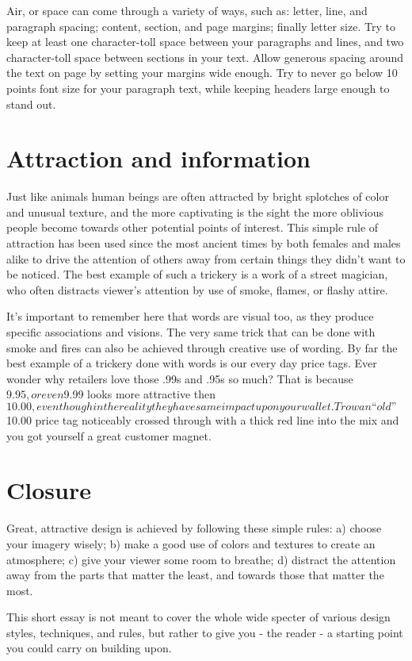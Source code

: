 Air, or space can come through a variety of ways, such as: letter, line, and
paragraph spacing; content, section, and page margins; finally letter size. Try
to keep at least one character-toll space between your paragraphs and lines, and
two character-toll space between sections in your text. Allow generous spacing
around the text on page by setting your margins wide enough. Try to never go
below 10 points font size for your paragraph text, while keeping headers large
enough to stand out.

\section*{Attraction and information}

Just like animals human beings are often attracted by bright splotches of color
and unusual texture, and the more captivating is the sight the more oblivious
people become towards other potential points of interest. This simple rule of
attraction has been used since the most ancient times by both females and males
alike to drive the attention of others away from certain things they didn’t want
to be noticed. The best example of such a trickery is a work of a street
magician, who often distracts viewer’s attention by use of smoke, flames, or
flashy attire.

It’s important to remember here that words are visual too, as they produce
specific associations and visions. The very same trick that can be done with
smoke and fires can also be achieved through creative use of wording. By far the
best example of a trickery done with words is our every day price tags. Ever
wonder why retailers love those .99s and .95s so much? That is because $9.95, or
even $9.99 looks more attractive then $10.00, even though in the reality they
have same impact upon your wallet. Trow an “old” $10.00 price tag noticeably
crossed through with a thick red line into the mix and you got yourself a great
customer magnet.

\section*{Closure}

Great, attractive design is achieved by following these simple rules: a) choose
your imagery wisely; b) make a good use of colors and textures to create an
atmosphere; c) give your viewer some room to breathe; d) distract the attention
away from the parts that matter the least, and towards those that matter the
most.

This short essay is not meant to cover the whole wide specter of various design
styles, techniques, and rules, but rather to give you - the reader - a starting
point you could carry on building upon.
